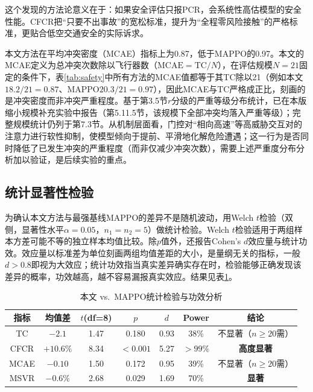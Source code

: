 \documentclass[12pt,a4paper,UTF8]{ctexart}
\begin{document}
这个发现的方法论意义在于：如果安全评估只报PCR，会系统性高估模型的安全性能。CFCR把“只要不出事故”的宽松标准，提升为“全程零风险接触”的严格标准，更贴合低空交通安全的实际诉求。

本文方法在平均冲突密度（MCAE）指标上为0.87，低于MAPPO的0.97。本文的MCAE定义为总冲突次数除以飞行器数（$\mathrm{MCAE}=\mathrm{TC}/N$），在评估规模$N=21$固定的条件下，表\ref{tab:safety}中所有方法的MCAE值都等于其TC除以21（例如本文$18.2/21=0.87$、MAPPO$20.3/21=0.97$），因此MCAE与TC严格成正比，刻画的是冲突密度而非冲突严重程度。基于第3.5节$r$分级的严重等级分布统计，已在本版缩小规模补充实验中报告（第5.11.5节，该规模下全部冲突均落入严重等级）；完整规模统计仍列于第7.3节。从机制层面看，门控对“相向高速”等高威胁交互对的注意力进行软性抑制，使模型倾向于提前、平滑地化解危险遭遇；这一行为是否同时降低了已发生冲突的严重程度（而非仅减少冲突次数），需要上述严重度分布分析加以验证，是后续实验的重点。

\subsection{统计显著性检验}

为确认本文方法与最强基线MAPPO的差异不是随机波动，用Welch $t$检验\cite{ref42}（双侧，显著性水平$\alpha=0.05$，$n_1=n_2=5$）做统计检验。Welch $t$检验适用于两组样本方差可能不等的独立样本均值比较。除$p$值外，还报告Cohen's $d$效应量\cite{ref43}与统计功效。效应量以标准差为单位刻画两组均值差距的大小，是量纲无关的指标，一般$d>0.8$即视为大效应；统计功效指当真实差异确实存在时，检验能够正确发现该差异的概率，功效越高，越不容易漏报真实效应。结果见表\ref{tab:ttest}。

\begin{table}[H]
    \centering
    \caption{本文 vs.\ MAPPO统计检验与功效分析}
    \label{tab:ttest}
    \begin{tabular}{ccccccc}
        \toprule
        \textbf{指标} & \textbf{均值差} & \textbf{$t$(df=8)} & \textbf{$p$} & \textbf{$d$} & \textbf{Power} & \textbf{结论} \\
        \midrule
        TC & $-2.1$ & 1.47 & 0.180 & 0.93 & 38\% & 不显著（$n\geq20$需） \\
        CFCR & $+10.6\%$ & 8.34 & $<0.001$ & 5.27 & $>99\%$ & \textbf{高度显著} \\
        MCAE & $-0.10$ & 1.50 & 0.172 & 0.95 & 39\% & 不显著（$n\geq20$需） \\
        MSVR & $-0.6\%$ & 2.68 & 0.029 & 1.69 & 70\% & \textbf{显著} \\
        \bottomrule
    \end{tabular}
\end{table}
\end{document}
